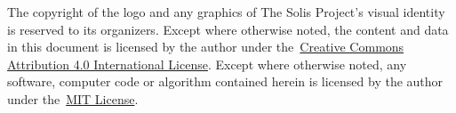 The copyright of the logo and any graphics of The Solis Project's visual identity is reserved to its organizers.
Except where otherwise noted, the content and data in this document is licensed by the author under the~\href{http://creativecommons.org/licenses/by/4.0/}{Creative Commons Attribution 4.0 International License}.
Except where otherwise noted, any software, computer code or algorithm contained herein is licensed by the author under the~\href{https://opensource.org/license/mit/}{MIT License}.\\
\par{\hfill\ccby}

